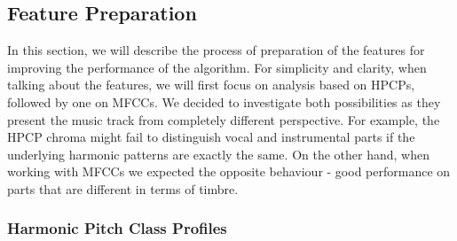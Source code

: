 \vspace{10pt}

\subsection{Feature Preparation}

In this section, we will describe the process of preparation of the features for improving the performance of the algorithm. For simplicity and clarity, when talking about the features, we will first focus on analysis based on HPCPs, followed by one on MFCCs.
We decided to investigate both possibilities as they present the music track from completely different perspective. For example, the HPCP chroma might fail to distinguish vocal and instrumental parts if the underlying harmonic patterns are exactly the same. On the other hand, when working with MFCCs we expected the opposite behaviour - good performance on parts that are different in terms of timbre.

\subsubsection*{Harmonic Pitch Class Profiles}

